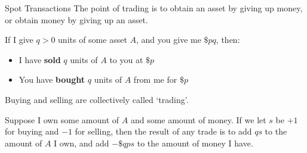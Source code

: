 \documentclass{beamer}
\begin{document}
\begin{frame}{Spot Transactions}
	The point of trading is to obtain an asset by giving up money, or obtain money by giving up an asset.%

	If I give $q>0$ units of some asset $A$, and you give me $\$pq$, then:%
	\begin{itemize}
		\item I have \textbf{sold} $q$ units of $A$ to you at $\$p$
		\item You have \textbf{bought} $q$ units of $A$ from me for $\$p$
	\end{itemize} %

	Buying and selling are collectively called `trading'.%

	Suppose I own some amount of $A$ and some amount of money. If we let $s$ be $+1$ for buying and $-1$ for selling, then the result of any trade is to add $qs$ to the amount of $A$ I own, and add $-\$qps$ to the amount of money I have. %

\end{frame}
\end{document}
